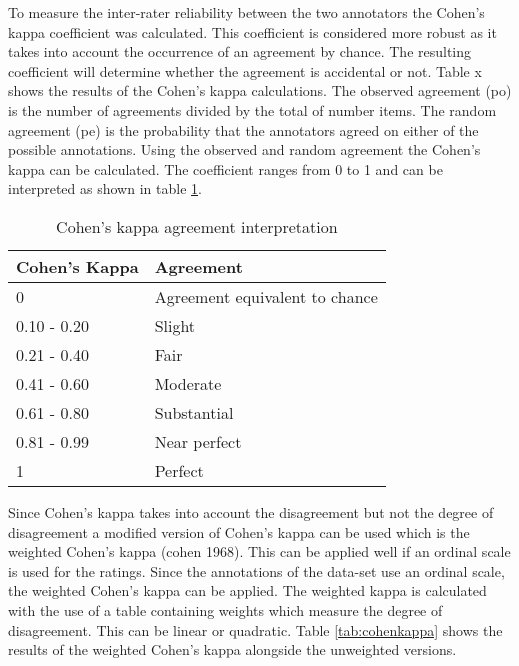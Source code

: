 To measure the inter-rater reliability between the two annotators the Cohen's kappa coefficient was calculated. This coefficient is considered more robust as it takes into account the occurrence of an agreement by chance. The resulting coefficient will determine whether the agreement is accidental or not. Table x shows the results of the Cohen's kappa calculations. The observed agreement (po) is the number of agreements divided by the total of number items. The random agreement (pe) is the probability that the annotators agreed on either of the possible annotations. Using the observed and random agreement the Cohen's kappa can be calculated. The coefficient ranges from 0 to 1 and can be interpreted as shown in table \ref{tab:cohenkappainterpret}.

\begin{table}[]
\begin{tabular}{|p{3cm}|p{3cm}|}
\hline
\rowcolor[HTML]{EFEFEF} 
{\color[HTML]{41474D} Cohen's Kappa} & {\color[HTML]{41474D} Agreement}                      \\ \hline
{\color[HTML]{41474D} 0}                   & {\color[HTML]{41474D} Agreement equivalent to chance} \\ \hline
{\color[HTML]{41474D} 0.10 - 0.20}         & {\color[HTML]{41474D} Slight}                         \\ \hline
{\color[HTML]{41474D} 0.21 - 0.40}         & {\color[HTML]{41474D} Fair}                           \\ \hline
{\color[HTML]{41474D} 0.41 - 0.60}         & {\color[HTML]{41474D} Moderate}                       \\ \hline
{\color[HTML]{41474D} 0.61 - 0.80}         & {\color[HTML]{41474D} Substantial}                    \\ \hline
{\color[HTML]{41474D} 0.81 - 0.99}         & {\color[HTML]{41474D} Near perfect}                   \\ \hline
{\color[HTML]{41474D} 1}                   & {\color[HTML]{41474D} Perfect}                        \\ \hline
\end{tabular}
\caption{Cohen's kappa agreement interpretation}
\label{tab:cohenkappainterpret}
\end{table}

Since Cohen's kappa takes into account the disagreement but not the degree of disagreement a modified version of Cohen's kappa can be used which is the weighted Cohen's kappa (cohen 1968). This can be applied well if an ordinal scale is used for the ratings. Since the annotations of the data-set use an ordinal scale, the weighted Cohen's kappa can be applied. The weighted kappa is calculated with the use of a table containing weights which measure the degree of disagreement. This can be linear or quadratic. Table \ref{tab:cohenkappa} shows the results of the weighted Cohen's kappa alongside the unweighted versions. 

